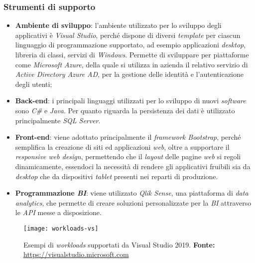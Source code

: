 
\subsubsection{Strumenti di supporto}
\begin{itemize}
	\item \textbf{Ambiente di sviluppo}: l'ambiente utilizzato per lo sviluppo degli applicativi è \textit{Visual Studio}, perché dispone di diversi \textit{template} per ciascun linguaggio di programmazione supportato, ad esempio applicazioni \textit{desktop}, libreria di classi, servizi di \textit{Windows}. Permette di sviluppare per piattaforme come \textit{Microsoft Azure}, della quale si utilizza in azienda il relativo servizio di \textit{Active Directory Azure AD}, per la gestione delle identità e l'autenticazione degli utenti;
	\item \textbf{Back-end}: i principali linguaggi utilizzati per lo sviluppo di nuovi \textit{software} sono \textit{C\#} e \textit{Java}. 
	Per quanto riguarda la persistenza dei dati è utilizzato principalmente \textit{SQL Server}.
	\item \textbf{Front-end}: viene adottato principalmente il \textit{framework Bootstrap}, perché semplifica la creazione di siti ed applicazioni \textit{web}, oltre a supportare il \textit{responsive web design}, permettendo che il \textit{layout} delle pagine \textit{web} si regoli dinamicamente, essendoci la necessità di rendere gli applicativi fruibili sia da \textit{desktop} che da dispositivi \textit{tablet} presenti nei reparti di produzione.
	\item \textbf{Programmazione \textit{BI}}: viene utilizzato \textit{Qlik Sense}, una piattaforma di \textit{data analytics}, che permette di creare soluzioni personalizzate per la \textit{BI} attraverso le \textit{API} messe a disposizione.
\end{itemize}



\begin{figure}[htbp]
	\begin{center}
		\texttt{[image: workloads-vs]}
		\caption{Esempi di \textit{workloads} supportati da Visual Studio 2019. \newline
		\textbf{Fonte: } \url{https://visualstudio.microsoft.com}}
	\end{center}
\end{figure}


